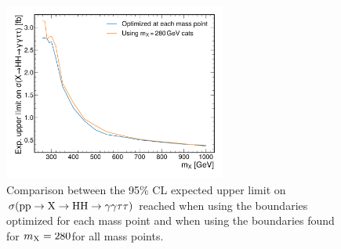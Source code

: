 \begin{figure}
    \centering
    \includegraphics[width=0.65\textwidth]{Figures/Dihiggs/categorisation/cat_optimal.pdf}
    \caption[Performance of a Grid Search of Category Boundaries at Every Mass Point Compared to a Single Point]{Comparison between the 95\% CL expected upper limit on $\sigma(\mathrm{p}\mathrm{p} \to \mathrm{X} \to \mathrm{H}\mathrm{H} \to \gamma\gamma\tau\tau)$ reached when using the boundaries optimized for each mass point and when using the boundaries found for $m_{\mathrm{X}}=280$\GeV for all mass points.}\label{fig:cat_optimal_comparison}
\end{figure}

